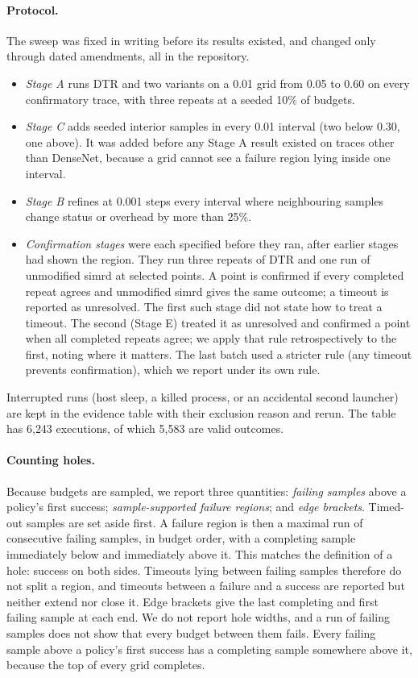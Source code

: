 \documentclass[11pt]{article}
\begin{document}
\paragraph{Protocol.} The sweep was fixed in writing before its results existed, and changed
only through dated amendments, all in the repository.
\begin{itemize}
\item \emph{Stage A} runs DTR and two variants on a 0.01 grid from 0.05 to 0.60 on every
confirmatory trace, with three repeats at a seeded 10\% of budgets.
\item \emph{Stage C} adds seeded interior samples in every 0.01 interval (two below 0.30,
one above). It was added before any Stage A result existed on traces other than DenseNet,
because a grid cannot see a failure region lying inside one interval.
\item \emph{Stage B} refines at 0.001 steps every interval where neighbouring samples
change status or overhead by more than 25\%.
\item \emph{Confirmation stages} were each specified before they ran, after earlier stages
had shown the region. They run three repeats of DTR and one run of unmodified simrd at
selected points. A point is confirmed if every completed repeat agrees and unmodified simrd
gives the same outcome; a timeout is reported as unresolved. The first such stage did not
state how to treat a timeout. The second (Stage E) treated it as unresolved and confirmed a
point when all completed repeats agree; we apply that rule retrospectively to the first,
noting where it matters. The last batch used a stricter rule (any timeout prevents
confirmation), which we report under its own rule.
\end{itemize}
Interrupted runs (host sleep, a killed process, or an accidental second launcher) are kept
in the evidence table with their exclusion reason and rerun. The table has 6{,}243
executions, of which 5{,}583 are valid outcomes.

\paragraph{Counting holes.} Because budgets are sampled, we report three quantities:
\emph{failing samples} above a policy's first success; \emph{sample-supported failure
regions}; and \emph{edge brackets}. Timed-out samples are set aside first. A failure region
is then a maximal run of consecutive failing samples, in budget order, with a completing
sample immediately below and immediately above it. This matches the definition of a hole:
success on both sides. Timeouts lying between failing samples therefore do not split a
region, and timeouts between a failure and a success are reported but neither extend nor
close it. Edge brackets give the last completing and first failing sample at each end. We do
not report hole widths, and a run of failing samples does not show that every budget
between them fails. Every failing sample above a policy's first success has a completing
sample somewhere above it, because the top of every grid completes.
\end{document}
